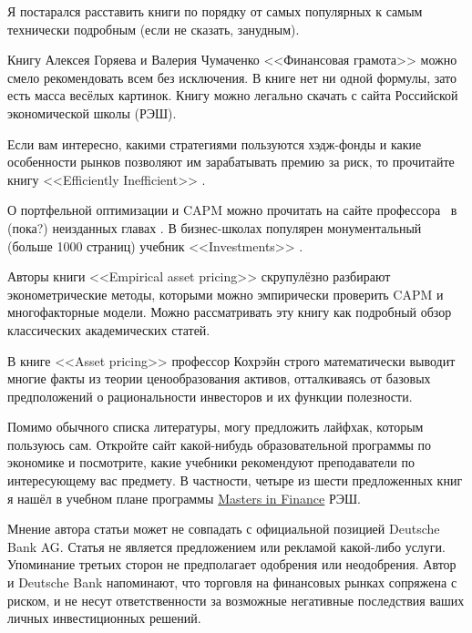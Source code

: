 Я постарался расставить книги по порядку от самых популярных к самым технически 
подробным (если не сказать, занудным).

Книгу Алексея Горяева и Валерия Чумаченко <<Финансовая грамота>> 
\cite{goryaev2009} можно смело рекомендовать всем без исключения. В книге нет 
ни одной формулы, зато есть масса весёлых картинок. Книгу можно легально скачать с 
сайта Российской экономической школы (РЭШ).

Если вам интересно, какими стратегиями пользуются хэдж-фонды и какие 
особенности рынков позволяют им зарабатывать премию за риск, то прочитайте 
книгу <<Efficiently Inefficient>> \cite{pedersen2015efficiently}.

О портфельной оптимизации и CAPM можно прочитать на сайте профессора \ в (пока?) неизданных главах  
\cite{welch}. В бизнес-школах популярен монументальный (больше 1000 страниц) 
учебник <<Investments>> \cite{bodie2014investments}.

Авторы книги <<Empirical asset pricing>> \cite{bali2016empirical} скрупулёзно 
разбирают эконометрические методы, которыми можно эмпирически проверить CAPM и 
многофакторные модели. Можно рассматривать эту книгу как подробный обзор 
классических академических статей.

В книге <<Asset pricing>> \cite{cochrane2005asset} профессор Кохрэйн строго 
математически выводит многие факты из теории ценообразования активов, 
отталкиваясь от базовых предположений о рациональности инвесторов и их 
функции полезности.

Помимо обычного списка литературы, могу предложить лайфхак, которым пользуюсь 
сам. Откройте сайт какой-нибудь образовательной программы по экономике и 
посмотрите, какие учебники рекомендуют преподаватели по интересующему вас 
предмету. В частности, четыре из шести предложенных книг я нашёл в учебном 
плане программы \href{https://www.nes.ru/MiF-uchplan?lang=ru}{Masters in 
Finance} РЭШ.

\clearpage
{}

Мнение автора статьи может не совпадать с официальной позицией Deutsche Bank 
AG. Статья не является предложением или рекламой какой-либо услуги. Упоминание
третьих сторон не предполагает одобрения или неодобрения. Автор и Deutsche Bank
напоминают, что торговля на финансовых рынках сопряжена с риском, и не несут
ответственности за возможные негативные последствия ваших личных инвестиционных
решений.

\clearpage
{}
\en{
\printbibliography[heading = none]
}

